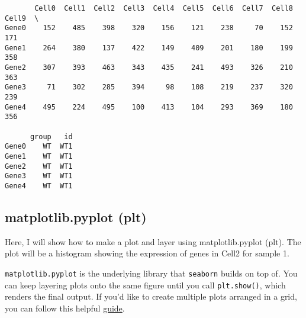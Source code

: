 \documentclass[
  letterpaper,
  DIV=11,
  numbers=noendperiod]{scrartcl}
\begin{document}
\begin{verbatim}
       Cell0  Cell1  Cell2  Cell3  Cell4  Cell5  Cell6  Cell7  Cell8  Cell9  \
Gene0    152    485    398    320    156    121    238     70    152    171   
Gene1    264    380    137    422    149    409    201    180    199    358   
Gene2    307    393    463    343    435    241    493    326    210    363   
Gene3     71    302    285    394     98    108    219    237    320    239   
Gene4    495    224    495    100    413    104    293    369    180    356   

      group   id  
Gene0    WT  WT1  
Gene1    WT  WT1  
Gene2    WT  WT1  
Gene3    WT  WT1  
Gene4    WT  WT1  
\end{verbatim}

\subsection{matplotlib.pyplot (plt)}\label{matplotlib.pyplot-plt}

Here, I will show how to make a plot and layer using matplotlib.pyplot
(plt). The plot will be a histogram showing the expression of genes in
Cell2 for sample 1.

\texttt{matplotlib.pyplot} is the underlying library that
\texttt{seaborn} builds on top of. You can keep layering plots onto the
same figure until you call \texttt{plt.show()}, which renders the final
output. If you'd like to create multiple plots arranged in a grid, you
can follow this helpful
\href{https://www.geeksforgeeks.org/plot-multiple-plots-in-matplotlib/}{guide}.
\end{document}
